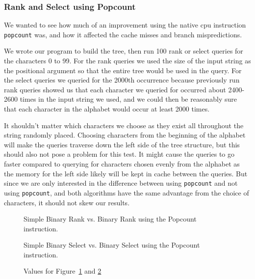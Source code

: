 \subsubsection{Rank and Select using Popcount}
We wanted to see how much of an improvement using the native cpu instruction \texttt{popcount} was, and how it affected the cache misses and branch mispredictions.

We wrote our program to build the tree, then run 100 rank or select queries for the characters 0 to 99.
For the rank queries we used the size of the input string as the positional argument so that the entire tree would be used in the query.
For the select queries we queried for the 2000th occurrence because previously run rank queries showed us that each character we queried for occurred about 2400-2600 times in the input string we used, and we could then be reasonably sure that each character in the alphabet would occur at least 2000 times.

It shouldn't matter which characters we choose as they exist all throughout the string randomly placed.
Choosing characters from the beginning of the alphabet will make the queries traverse down the left side of the tree structure, but this should also not pose a problem for this test.
It might cause the queries to go faster compared to querying for characters chosen evenly from the alphabet as the memory for the left side likely will be kept in cache between the queries.
But since we are only interested in the difference between using \texttt{popcount} and not using \texttt{popcount}, and both algorithms have the same advantage from the choice of characters, it should not skew our results.

\begin{figure}
\caption{Simple Binary Rank vs. Binary Rank using the Popcount instruction.}
\label{fig:rankPopcountDiff}

\end{figure}

\begin{figure}
\caption{Simple Binary Select vs. Binary Select using the Popcount instruction.}
\label{fig:selectPopcountDiff}

\end{figure}

\begin{figure}
\caption{Values for Figure~\ref{fig:rankPopcountDiff} and \ref{fig:selectPopcountDiff}}
\label{fig:valuesForPopcountDiff}

\end{figure}

